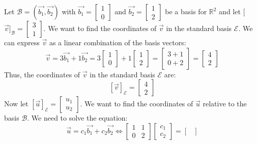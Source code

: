 \begin{eg}
    Let $\mathcal{B} = (\vec{b_1}, \vec{b_2})$ with $\vec{b_1} = \begin{bmatrix}1 \\ 0\end{bmatrix}$ and $\vec{b_2} = \begin{bmatrix}1 \\ 2\end{bmatrix}$ be a basis for $\mathbb{R}^2$ and let [$\vec{v}]_{\mathcal{B}} = \begin{bmatrix}
        3 \\ 1
    \end{bmatrix}$. We want to find the coordinates of $\vec{v}$ in the standard basis $\mathcal{E}$. We can express $\vec{v}$ as a linear combination of the basis vectors:
    \[ \vec{v} = 3\vec{b_1} + 1\vec{b_2} = 3\begin{bmatrix}1 \\ 0\end{bmatrix} + 1\begin{bmatrix}1 \\ 2\end{bmatrix} = \begin{bmatrix}
        3 + 1 \\ 0 + 2
    \end{bmatrix} = \begin{bmatrix}
        4 \\ 2
    \end{bmatrix} \]
    Thus, the coordinates of $\vec{v}$ in the standard basis $\mathcal{E}$ are:
    \[ [\vec{v}]_{\mathcal{E}} = \begin{bmatrix}
        4 \\ 2
    \end{bmatrix} \]
    Now let $[\vec{u}]_{\mathcal{E}} = \begin{bmatrix}
        u_1 \\ u_2
    \end{bmatrix}$. We want to find the coordinates of $\vec{u}$ relative to the basis $\mathcal{B}$. We need to solve the equation:
    \[ \vec{u} = c_1 \vec{b_1} + c_2 \vec{b_2} \iff  \begin{bmatrix}
        1 & 1 \\
        0 & 2
    \end{bmatrix} \begin{bmatrix}
        c_1 \\ c_2
    \end{bmatrix} = \begin{bmatrix}

\end{bmatrix}\]
\end{eg}
